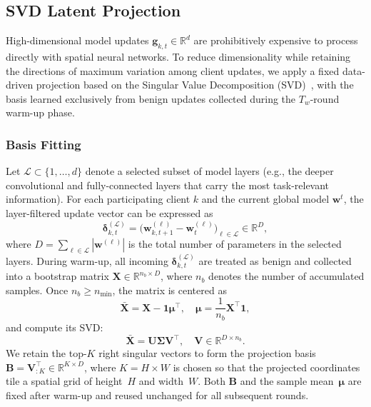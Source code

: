 \documentclass[journal]{IEEEtran}
\begin{document}
\subsection{SVD Latent Projection}

High-dimensional model updates $\mathbf{g}_{k,t} \in \mathbb{R}^d$ are prohibitively expensive to process directly with spatial neural networks. To reduce dimensionality while retaining the directions of maximum variation among client updates, we apply a fixed data-driven projection based on the Singular Value Decomposition (SVD)~\cite{zhang2015singular}, with the basis learned exclusively from benign updates collected during the $T_w$-round warm-up phase.

\subsubsection{Basis Fitting}
Let $\mathcal{L} \subset \{1, \ldots, d\}$ denote a selected subset of model layers (e.g., the deeper convolutional and fully-connected layers that carry the most task-relevant information). For each participating client $k$ and the current global model $\mathbf{w}^t$, the layer-filtered update vector can be expressed as
\begin{equation}
\boldsymbol{\delta}_{k,t}^{(\mathcal{L})} = \bigl(\mathbf{w}_{k,t+1}^{(\ell)} - \mathbf{w}_t^{(\ell)}\bigr)_{\ell \in \mathcal{L}} \in \mathbb{R}^D,
\label{eq:layer_update}
\end{equation}
where $D = \sum_{\ell \in \mathcal{L}} |\mathbf{w}^{(\ell)}|$ is the total number of parameters in the selected layers. During warm-up, all incoming $\boldsymbol{\delta}_{k,t}^{(\mathcal{L})}$ are treated as benign and collected into a bootstrap matrix $\mathbf{X} \in \mathbb{R}^{n_b \times D}$, where $n_b$ denotes the number of accumulated samples. Once $n_b \geq n_{\min}$, the matrix is centered as
\begin{equation}
\bar{\mathbf{X}} = \mathbf{X} - \mathbf{1}\boldsymbol{\mu}^\top, \quad \boldsymbol{\mu} = \frac{1}{n_b} \mathbf{X}^\top \mathbf{1},
\label{eq:centering}
\end{equation}
and compute its SVD:
\begin{equation}
\bar{\mathbf{X}} = \mathbf{U} \boldsymbol{\Sigma} \mathbf{V}^\top, \quad \mathbf{V} \in \mathbb{R}^{D \times n_b}.
\label{eq:svd}
\end{equation}
We retain the top-$K$ right singular vectors to form the projection basis $\mathbf{B} = \mathbf{V}_{:K}^\top \in \mathbb{R}^{K \times D}$, where $K = H \times W$ is chosen so that the projected coordinates tile a spatial grid of height~$H$ and width~$W$. Both $\mathbf{B}$ and the sample mean~$\boldsymbol{\mu}$ are fixed after warm-up and reused unchanged for all subsequent rounds.
\end{document}
